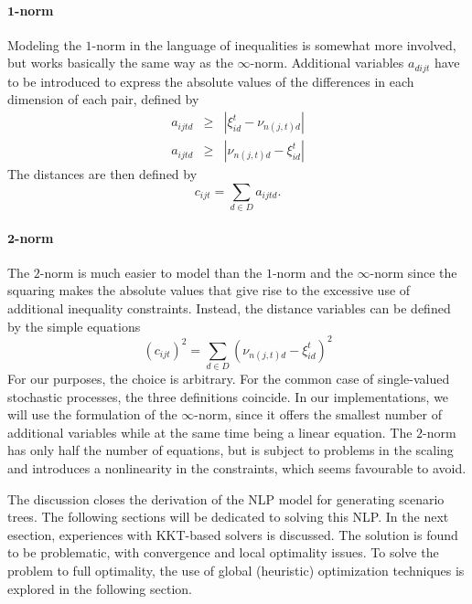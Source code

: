 \paragraph{$\mathbf{1}$-norm} Modeling the $1$-norm in the language of inequalities is somewhat more involved, but works basically the same way as the $\infty$-norm. Additional variables $a_{dijt}$ have to be introduced to express the absolute values of the differences in each dimension of each pair, defined by
\begin{eqnarray}
  \label{eq:c-as-1norm-def-a}
  a_{ijtd} &\geq& \left| \xi_{id}^t - \nu_{n(j,t)d}\right| \\
  a_{ijtd} &\geq& \left|  \nu_{n(j,t)d} - \xi_{id}^t\right|
\end{eqnarray}
The distances are then defined by
\begin{equation}
  \label{eq:c-as-1norm}
  c_{ijt} = \sum_{d \in D} a_{ijtd}.
\end{equation}
\paragraph{$\mathbf{2}$-norm} The $2$-norm is much easier to model than the $1$-norm and the $\infty$-norm since the squaring makes the absolute values that give rise to the excessive use of additional inequality constraints. Instead, the distance variables can be defined by the simple equations
\begin{equation}
  \label{eq:c-as-2norm}
  \left(c_{ijt} \right)^2 = \sum_{d \in D}\left( \nu_{n(j,t)d} - \xi_{id}^t \right)^2
\end{equation}
For our purposes, the choice is arbitrary. For the common case of single-valued stochastic processes, the three definitions coincide. In our implementations, we will use the formulation of the $\infty$-norm, since it offers the smallest number of additional variables while at the same time being a linear equation. The $2$-norm has only half the number of equations, but is subject to problems in the scaling and introduces a nonlinearity in the constraints, which seems favourable to avoid.

The discussion closes the derivation of the NLP model for generating scenario trees. The following sections will be dedicated to solving this NLP. In the next esection, experiences with KKT-based solvers is discussed. The solution is found to be problematic, with convergence and local optimality issues. To solve the problem to full optimality, the use of global (heuristic) optimization techniques is explored in the following section.
